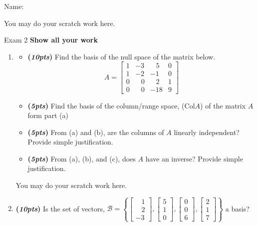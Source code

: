 \documentclass[12pt]{article}%
\begin{document}
Name:\hrulefill

\newpage
You may do your scratch work here.
\newpage

Exam 2 \hfill \textbf{Show all your work}
\\
\HRule


\begin{enumerate}     
    \item 
    \begin{itemize}
        \item[a)] \textbf{(\emph{10pts})} Find the basis of the null space of the matrix below. 
        \[
        A = \begin{bmatrix}
            1 & -3 & \;\;\;5 & 0\\
            1 & -2 & -1 & 0\\
            0 & \;\;\;0 & \;\;\;2 &  1\\
            0 & \;\;\;0 & -18 & 9 
        \end{bmatrix}
        \]
        
        \vspace{7cm}

         \item[b)] \textbf{(\emph{5pts})} Find the basis of the column/range space, (Col\(A\)) of the matrix \(A\) form part (a)
        
        \vspace{4cm}
        
        \item[c)]\textbf{(\emph{5pts})} From (a) and (b), are the columns of \(A\) linearly independent?  Provide simple justification.
        \vspace{3cm}
        
        \item[d)]\textbf{(\emph{5pts})} From (a), (b), and (c), does \(A\) have an inverse? Provide simple justification.
    \end{itemize}
    
    \newpage
     You may do your scratch work here.
    
    \newpage


    \item \textbf{(\emph{10pts})} 
        Is the set of vectors, 
        \(
        \mathcal{B} = \left\{
        \begin{bmatrix} \;\;\;1\\\;\;\;2\\-3 \end{bmatrix},
        \begin{bmatrix} 5\\1\\0 \end{bmatrix},
        \begin{bmatrix} 0\\0\\6 \end{bmatrix}, \begin{bmatrix} 2\\1\\7 \end{bmatrix}
        \right\}
        \)
        a basis? 
        

\end{enumerate}
\end{document}
